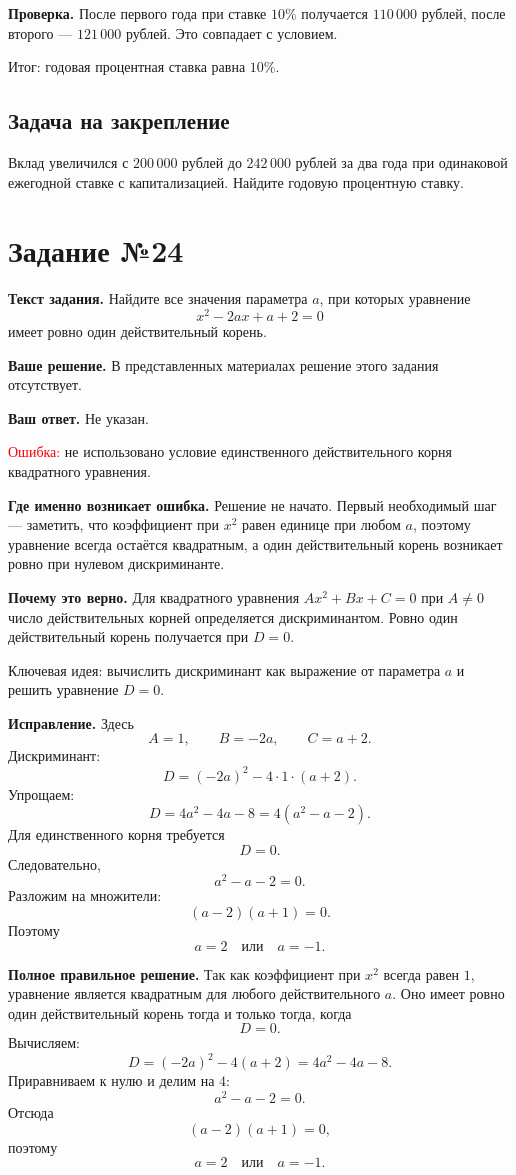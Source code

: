 \documentclass[12pt,a4paper]{article}
\newcommand{\err}{\textcolor{red}{Ошибка:}}
\newcommand{\idea}{\textcolor{blue!60!black}{Ключевая идея:}}
\newcommand{\result}{\textcolor{teal!60!black}{Итог:}}
\newcommand{\tasktitle}[1]{\phantomsection\label{task:#1}\section*{Задание №#1}}
\begin{document}
\textbf{Проверка.} После первого года при ставке $10\%$ получается $110\,000$ рублей, после второго --- $121\,000$ рублей. Это совпадает с условием.

\result{} годовая процентная ставка равна $10\%$.

\subsection*{Задача на закрепление}
Вклад увеличился с $200\,000$ рублей до $242\,000$ рублей за два года при одинаковой ежегодной ставке с капитализацией. Найдите годовую процентную ставку.

\newpage
\tasktitle{24}
\textbf{Текст задания.} Найдите все значения параметра $a$, при которых уравнение
\[
x^2-2ax+a+2=0
\]
имеет ровно один действительный корень.

\textbf{Ваше решение.} В представленных материалах решение этого задания отсутствует.

\textbf{Ваш ответ.} Не указан.

\err{} не использовано условие единственного действительного корня квадратного уравнения.

\textbf{Где именно возникает ошибка.} Решение не начато. Первый необходимый шаг --- заметить, что коэффициент при $x^2$ равен единице при любом $a$, поэтому уравнение всегда остаётся квадратным, а один действительный корень возникает ровно при нулевом дискриминанте.

\textbf{Почему это верно.} Для квадратного уравнения $Ax^2+Bx+C=0$ при $A\ne0$ число действительных корней определяется дискриминантом. Ровно один действительный корень получается при $D=0$.

\idea{} вычислить дискриминант как выражение от параметра $a$ и решить уравнение $D=0$.

\textbf{Исправление.} Здесь
\[
A=1,\qquad B=-2a,\qquad C=a+2.
\]
Дискриминант:
\[
D=(-2a)^2-4\cdot1\cdot(a+2).
\]
Упрощаем:
\[
D=4a^2-4a-8=4(a^2-a-2).
\]
Для единственного корня требуется
\[
D=0.
\]
Следовательно,
\[
a^2-a-2=0.
\]
Разложим на множители:
\[
(a-2)(a+1)=0.
\]
Поэтому
\[
a=2\quad\text{или}\quad a=-1.
\]

\textbf{Полное правильное решение.} Так как коэффициент при $x^2$ всегда равен $1$, уравнение является квадратным для любого действительного $a$. Оно имеет ровно один действительный корень тогда и только тогда, когда
\[
D=0.
\]
Вычисляем:
\[
D=(-2a)^2-4(a+2)=4a^2-4a-8.
\]
Приравниваем к нулю и делим на $4$:
\[
a^2-a-2=0.
\]
Отсюда
\[
(a-2)(a+1)=0,
\]
поэтому
\[
a=2\quad\text{или}\quad a=-1.
\]
\end{document}
